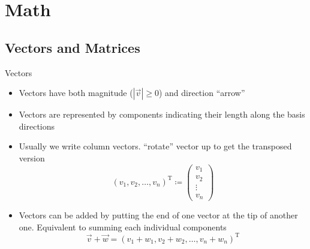 

\subtitle{Part I -- Math and Minimizers}


  \maketitle

  \section{Math}

  \subsection{Vectors and Matrices}

  \begin{frame}{Vectors}
    \begin{itemize}
      \item Vectors have both magnitude ($|\vec{v}| \geq 0$) and direction
        \rightarrow \enquote{arrow}
      \item Vectors are represented by components indicating their length
        along the basis directions
      \item Usually we write column vectors.
        \enquote{rotate} vector up to get the transposed version
        \begin{equation*}
          \left(v_1, v_2, \dots, v_n\right)^\mathrm{T} \coloneqq
          \begin{pmatrix} v_1 \\ v_2 \\ \vdots \\ v_n \end{pmatrix}
        \end{equation*}
      \item Vectors can be added by putting the end of one vector at the tip
        of another one. Equivalent to summing each individual components
        \begin{equation*}
          \vec{v} + \vec{w} =
            \left(v_1 + w_1, v_2 + w_2, \dots, v_n + w_n\right)^\mathrm{T}
        \end{equation*}
    \end{itemize}
  \end{frame}


